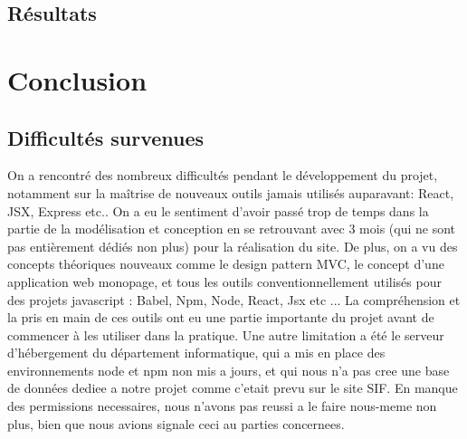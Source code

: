 \documentclass[a4paper,12pt]{report}
\theoremstyle{break}
\theoremstyle{break}
\theoremstyle{break}
\theoremstyle{break}
\theoremstyle{definition}
\theoremstyle{remark}
\begin{document}
\section{Résultats}
\chapter{Conclusion}
\section{Difficultés survenues}
On a rencontré des nombreux difficultés pendant le développement du projet, notamment sur la maîtrise de
nouveaux outils jamais utilisés auparavant: React, JSX, Express etc..
On a eu le sentiment d'avoir passé trop de temps dans la partie de la modélisation et conception en se retrouvant
avec 3 mois (qui ne sont pas entièrement dédiés non plus) pour la réalisation du site.
De plus, on a vu des concepts théoriques nouveaux comme le design pattern MVC, le concept d'une application web monopage,
et tous les outils conventionnellement utilisés pour des projets javascript : Babel, Npm, Node, React, Jsx etc ...
La compréhension et la pris en main de ces outils ont eu une partie importante du projet avant de commencer à les utiliser dans la pratique.
Une autre limitation a été le serveur d'hébergement du département informatique, qui a mis en place des environnements node et npm non mis a jours,
et qui nous n’a pas cree une base de données  dediee a notre projet comme c’etait prevu sur le site SIF. En manque des permissions necessaires, nous n’avons pas reussi a le faire nous-meme non plus, bien que nous avions signale ceci au parties concernees.


\end{document}
